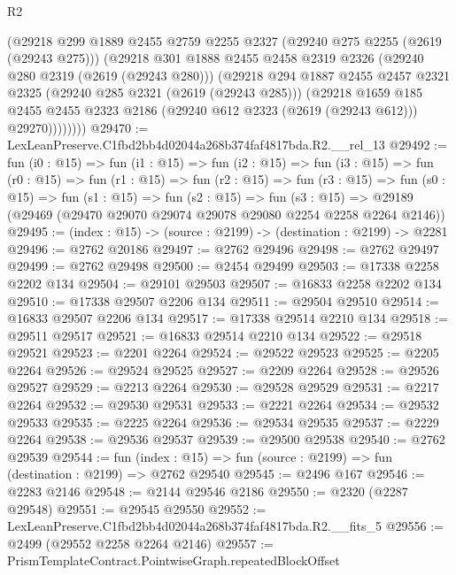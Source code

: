 \begin{lexlean}{R2}
\begin{coremodule}
            (@29218
              @299
              @1889
              @2455
              @2759
              @2255
              @2327
              (@29240 @275 @2255 (@2619 (@29243 @275)))
              (@29218
                @301
                @1888
                @2455
                @2458
                @2319
                @2326
                (@29240 @280 @2319 (@2619 (@29243 @280)))
                (@29218
                  @294
                  @1887
                  @2455
                  @2457
                  @2321
                  @2325
                  (@29240 @285 @2321 (@2619 (@29243 @285)))
                  (@29218
                    @1659
                    @185
                    @2455
                    @2455
                    @2323
                    @2186
                    (@29240 @612 @2323 (@2619 (@29243 @612)))
                    @29270))))))))
@29470 := LexLeanPreserve.C1fbd2bb4d02044a268b374faf4817bda.R2.__rel_13
@29492 := fun (i0 : @15) =>
  fun (i1 : @15) =>
  fun (i2 : @15) =>
  fun (i3 : @15) =>
  fun (r0 : @15) =>
  fun (r1 : @15) =>
  fun (r2 : @15) =>
  fun (r3 : @15) =>
  fun (s0 : @15) =>
  fun (s1 : @15) =>
  fun (s2 : @15) =>
  fun (s3 : @15) => @29189 (@29469 (@29470 @29070 @29074 @29078 @29080 @2254 @2258 @2264 @2146))
@29495 := (index : @15) -> (source : @2199) -> (destination : @2199) -> @2281
@29496 := @2762 @20186
@29497 := @2762 @29496
@29498 := @2762 @29497
@29499 := @2762 @29498
@29500 := @2454 @29499
@29503 := @17338 @2258 @2202 @134
@29504 := @29101 @29503
@29507 := @16833 @2258 @2202 @134
@29510 := @17338 @29507 @2206 @134
@29511 := @29504 @29510
@29514 := @16833 @29507 @2206 @134
@29517 := @17338 @29514 @2210 @134
@29518 := @29511 @29517
@29521 := @16833 @29514 @2210 @134
@29522 := @29518 @29521
@29523 := @2201 @2264
@29524 := @29522 @29523
@29525 := @2205 @2264
@29526 := @29524 @29525
@29527 := @2209 @2264
@29528 := @29526 @29527
@29529 := @2213 @2264
@29530 := @29528 @29529
@29531 := @2217 @2264
@29532 := @29530 @29531
@29533 := @2221 @2264
@29534 := @29532 @29533
@29535 := @2225 @2264
@29536 := @29534 @29535
@29537 := @2229 @2264
@29538 := @29536 @29537
@29539 := @29500 @29538
@29540 := @2762 @29539
@29544 := fun (index : @15) => fun (source : @2199) => fun (destination : @2199) => @2762 @29540
@29545 := @2496 @167
@29546 := @2283 @2146
@29548 := @2144 @29546 @2186
@29550 := @2320 (@2287 @29548)
@29551 := @29545 @29550
@29552 := LexLeanPreserve.C1fbd2bb4d02044a268b374faf4817bda.R2.__fits_5
@29556 := @2499 (@29552 @2258 @2264 @2146)
@29557 := PrismTemplateContract.PointwiseGraph.repeatedBlockOffset

\end{coremodule}
\end{lexlean}
